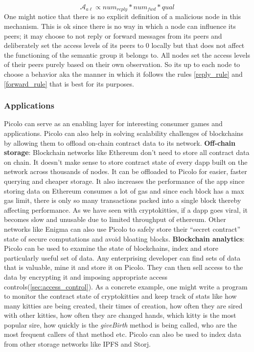 \newline
$$ \mathcal{A}_{a\ell} \propto num_{reply} * num_{fwd} * qual$$
One might notice that there is no explicit definition of a malicious node in this mechanism. This is ok since there is no way in which a node can influence its peers; it may choose to not reply or forward messages from its peers and deliberately set the access levels of its peers to 0 locally but that does not affect the functioning of the semantic group it belongs to. All nodes set the access levels of their peers purely based on their own observation. So its up to each node to choose a behavior aka the manner in which it follows the rules \ref{reply_rule} and \ref{forward_rule} that is best for its purposes.

\subsubsection{Applications}
Picolo can serve as an enabling layer for interesting consumer games and applications. Picolo can also help in solving scalability challenges of blockchains by allowing them to offload on-chain contract data to its network. 
\newline\newline
\textbf{Off-chain storage}: Blockchain networks like Ethereum don't need to store all contract data on chain. It doesn't make sense to store contract state of every dapp built on the network across thousands of nodes. It can be offloaded to Picolo for easier, faster querying and cheaper storage. It also increases the performance of the app since storing data on Ethereum consumes a lot of gas and since each block has a max gas limit, there is only so many transactions packed into a single block thereby affecting performance. As we have seen with cryptokitties, if a dapp goes viral, it becomes slow and unusable due to limited throughput of ethereum. Other networks like Enigma \cite{enigma} can also use Picolo to safely store their ``secret contract'' state of secure computations and avoid bloating blocks.
\newline\newline
\textbf{Blockchain analytics}: Picolo can be used to examine the state of blockchains, index and store particularly useful set of data. Any enterprising developer can find sets of data that is valuable, mine it and store it on Picolo. They can then sell access to the data by encrypting it and imposing appropriate access controls(\cref{sec:access_control}). As a concrete example, one might write a program to monitor the contract state of cryptokitties and keep track of stats like how many kitties are being created, their times of creation, how often they are sired with other kitties, how often they are changed hands, which kitty is the most popular sire, how quickly is the \textit{giveBirth} method is being called, who are the most frequent callers of that method etc. Picolo can also be used to index data from other storage networks like IPFS and Storj. 

